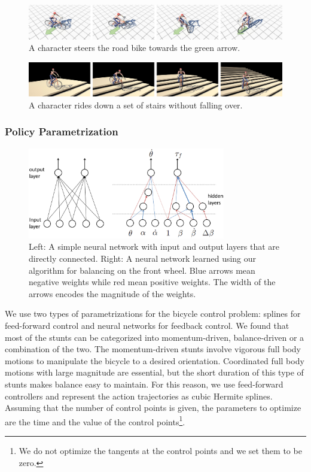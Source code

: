 \begin{figure}[!t]
\centering
\includegraphics[width=\textwidth]{figures/maneuver}
\caption{A character steers the road bike towards the green arrow.}
\label{fig:balance}
\end{figure}

\begin{figure}[!t]
\centering
\includegraphics[width=\textwidth]{figures/staircase}
\caption{A character rides down a set of stairs without falling over.}
\vspace{-0.1in}
\label{fig:stair}
\end{figure}

\subsubsection{Policy Parametrization}
\label{sec:parametrization}

\begin{figure}[!t]
  \centering
  \includegraphics[width=3.4in]{figures/simpleNetwork}
  \caption{Left: A simple neural network with input and output layers that are directly connected. Right: A neural network learned using our algorithm for balancing on the front wheel. Blue arrows mean negative weights while red mean positive weights. The width of the arrows encodes the magnitude of the weights. }
  \vspace{-0.1in}
  \label{fig:simpleNetwork}
\end{figure}

We use two types of parametrizations for the bicycle control problem: splines for feed-forward control and neural networks for feedback control. We found that most of the stunts can be categorized into momentum-driven, balance-driven or a combination of the two. The momentum-driven stunts involve vigorous full body motions to manipulate the bicycle to a desired orientation. Coordinated full body motions with large magnitude are essential, but the short duration of this type of stunts makes balance easy to maintain. For this reason, we use feed-forward controllers and represent the action trajectories as cubic Hermite splines. Assuming that the number of control points is given, the parameters to optimize are the time and the value of the control points\footnote{We do not optimize the tangents at the control points and we set them to be zero.}.

